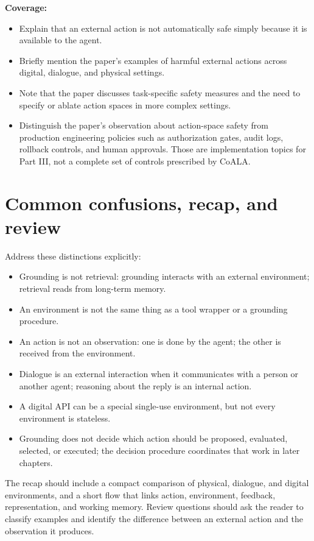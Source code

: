 \textbf{Coverage:}
\begin{itemize}
  \item Explain that an external action is not automatically safe simply because it is available to the agent.
  \item Briefly mention the paper's examples of harmful external actions across digital, dialogue, and physical settings.
  \item Note that the paper discusses task-specific safety measures and the need to specify or ablate action spaces in more complex settings.
  \item Distinguish the paper's observation about action-space safety from production engineering policies such as authorization gates, audit logs, rollback controls, and human approvals. Those are implementation topics for Part III, not a complete set of controls prescribed by CoALA.
\end{itemize}

\section{Common confusions, recap, and review}
Address these distinctions explicitly:
\begin{itemize}
  \item Grounding is not retrieval: grounding interacts with an external environment; retrieval reads from long-term memory.
  \item An environment is not the same thing as a tool wrapper or a grounding procedure.
  \item An action is not an observation: one is done by the agent; the other is received from the environment.
  \item Dialogue is an external interaction when it communicates with a person or another agent; reasoning about the reply is an internal action.
  \item A digital API can be a special single-use environment, but not every environment is stateless.
  \item Grounding does not decide which action should be proposed, evaluated, selected, or executed; the decision procedure coordinates that work in later chapters.
\end{itemize}

The recap should include a compact comparison of physical, dialogue, and digital environments, and a short flow that links action, environment, feedback, representation, and working memory. Review questions should ask the reader to classify examples and identify the difference between an external action and the observation it produces.

